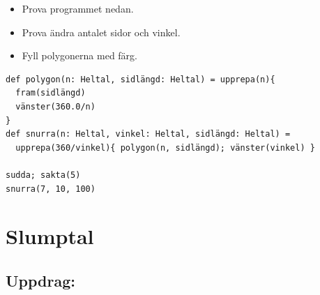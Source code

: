 \begin{itemize}

\item {Prova programmet nedan.}
\item {Prova ändra antalet sidor och vinkel.}
\item {Fyll polygonerna med färg.}

\end{itemize}



  

\begin{lstlisting}[basicstyle={\ttfamily\fontsize{16}{19}\selectfont},numbers=none]
def polygon(n: Heltal, sidlängd: Heltal) = upprepa(n){
  fram(sidlängd)
  vänster(360.0/n)
}
def snurra(n: Heltal, vinkel: Heltal, sidlängd: Heltal) = 
  upprepa(360/vinkel){ polygon(n, sidlängd); vänster(vinkel) }

sudda; sakta(5)
snurra(7, 10, 100)
\end{lstlisting}
        
\chapter{Slumptal}\section*{\color{BrickRed}Uppdrag:}


